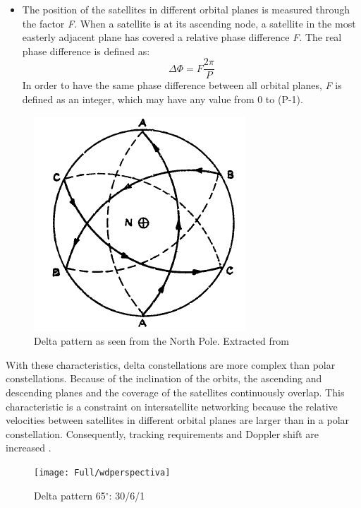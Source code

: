 \begin{itemize}
\item The position of the satellites in different orbital planes is measured through the factor \textit{F}. When a satellite is at its ascending node, a satellite in the most easterly adjacent plane has covered a relative phase difference \textit{F}. The real phase difference is defined as:
\begin{equation}
\Delta\Phi=F\frac{2\pi}{P}
\end{equation}
In order to have the same phase difference between all orbital planes, \textit{F} is defined as an integer, which may have any value from 0 to (P-1).

\end{itemize}

\begin{figure}[h!]
\centerline{\includegraphics[scale=0.75]{Full/walkerdeltaplanta.png}}
\caption{Delta pattern as seen from the North Pole. Extracted from \cite{Walker1977}}
\label{fig:delta pattern North Pole}
\end{figure}

With these characteristics, delta constellations are more complex than polar constellations. Because of the inclination of the orbits, the ascending and descending planes and the coverage of the satellites continuously overlap. This characteristic is a constraint on intersatellite networking because the relative velocities between satellites in different orbital planes are larger than in a polar constellation. Consequently, tracking requirements and Doppler shift are increased \cite{Wood1940}.

\begin{figure}[h!]
\centerline{\texttt{[image: Full/wdperspectiva]}}
\caption{Delta pattern 65$^{\circ}$: 30/6/1}
\label{fig:delta pattern notation}
\end{figure}


